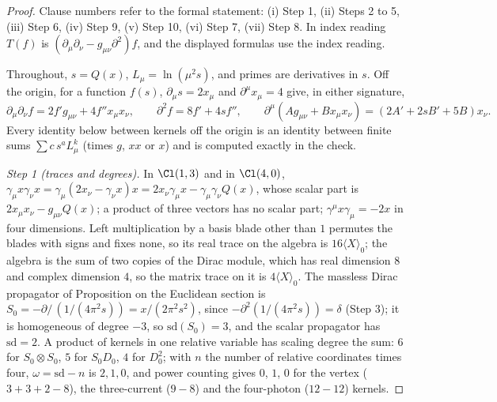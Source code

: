 \begin{proof}
Clause numbers refer to the formal statement: (i) Step 1, (ii) Steps 2 to 5, (iii) Step 6, (iv) Step 9, (v) Step 10, (vi) Step 7, (vii) Step 8. In index reading $T(f)$ is $(\partial_{\mu}\partial_{\nu} - g_{\mu\nu}\partial^{2})f$, and the displayed formulas use the index reading.

Throughout, $s = Q(x)$, $L_{\mu} = \ln(\mu^{2}s)$, and primes are derivatives in $s$. Off the origin, for a function $f(s)$, $\partial_{\mu}s = 2x_{\mu}$ and $\partial^{\mu}x_{\mu} = 4$ give, in either signature,
\[
\partial_{\mu}\partial_{\nu}f = 2f'g_{\mu\nu} + 4f''x_{\mu}x_{\nu}, \qquad \partial^{2}f = 8f' + 4sf'', \qquad \partial^{\mu}(Ag_{\mu\nu} + Bx_{\mu}x_{\nu}) = (2A' + 2sB' + 5B)x_{\nu}.
\]
Every identity below between kernels off the origin is an identity between finite sums $\sum c\,s^{a}L_{\mu}^{k}$ (times $g$, $xx$ or $x$) and is computed exactly in the check.

\emph{Step 1 (traces and degrees).} In $\Cl(1,3)$ and in $\Cl(4,0)$, $\gamma_{\mu}x\gamma_{\nu}x = \gamma_{\mu}(2x_{\nu} - \gamma_{\nu}x)x = 2x_{\nu}\gamma_{\mu}x - \gamma_{\mu}\gamma_{\nu}Q(x)$, whose scalar part is $2x_{\mu}x_{\nu} - g_{\mu\nu}Q(x)$; a product of three vectors has no scalar part; $\gamma^{\mu}x\gamma_{\mu} = -2x$ in four dimensions. Left multiplication by a basis blade other than $1$ permutes the blades with signs and fixes none, so its real trace on the algebra is $16\langle X\rangle_{0}$; the algebra is the sum of two copies of the Dirac module, which has real dimension $8$ and complex dimension $4$, so the matrix trace on it is $4\langle X\rangle_{0}$. The massless Dirac propagator of Proposition  on the Euclidean section is $S_{0} = -\partial\!\!\!/\,(1/(4\pi^{2}s)) = x/(2\pi^{2}s^{2})$, since $-\partial^{2}(1/(4\pi^{2}s)) = \delta$ (Step 3); it is homogeneous of degree $-3$, so $\mathrm{sd}(S_{0}) = 3$, and the scalar propagator has $\mathrm{sd} = 2$. A product of kernels in one relative variable has scaling degree the sum: $6$ for $S_{0}\otimes S_{0}$, $5$ for $S_{0}D_{0}$, $4$ for $D_{0}^{2}$; with $n$ the number of relative coordinates times four, $\omega = \mathrm{sd} - n$ is $2, 1, 0$, and power counting gives $0$, $1$, $0$ for the vertex ($3 + 3 + 2 - 8$), the three-current ($9 - 8$) and the four-photon ($12 - 12$) kernels.


\end{proof}
